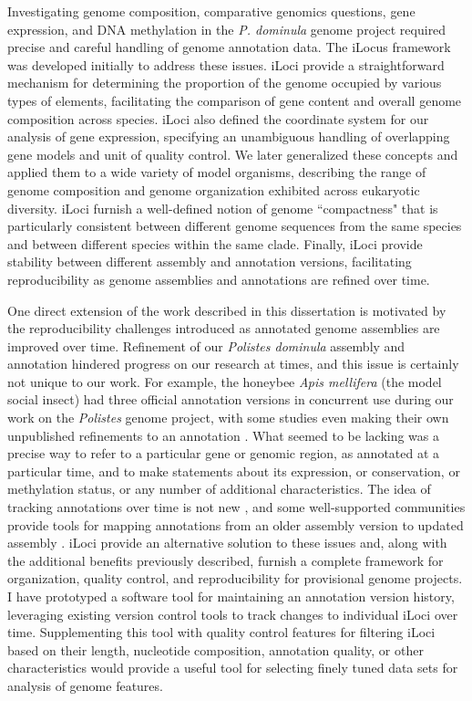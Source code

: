 Investigating genome composition, comparative genomics questions, gene expression, and DNA methylation in the \textit{P. dominula} genome project required precise and careful handling of genome annotation data.
The iLocus framework was developed initially to address these issues.
iLoci provide a straightforward mechanism for determining the proportion of the genome occupied by various types of elements, facilitating the comparison of gene content and overall genome composition across species.
iLoci also defined the coordinate system for our analysis of gene expression, specifying an unambiguous handling of overlapping gene models and unit of quality control.
We later generalized these concepts and applied them to a wide variety of model organisms, describing the range of genome composition and genome organization exhibited across eukaryotic diversity.
iLoci furnish a well-defined notion of genome ``compactness" that is particularly consistent between different genome sequences from the same species and between different species within the same clade.
Finally, iLoci provide stability between different assembly and annotation versions, facilitating reproducibility as genome assemblies and annotations are refined over time.

One direct extension of the work described in this dissertation is motivated by the reproducibility challenges introduced as annotated genome assemblies are improved over time.
Refinement of our \textit{Polistes dominula} assembly and annotation hindered progress on our research at times, and this issue is certainly not unique to our work.
For example, the honeybee \textit{Apis mellifera} (the model social insect) had three official annotation versions in concurrent use during our work on the \textit{Polistes} genome project, with some studies even making their own unpublished refinements to an annotation \cite{Dnmt3KD,TrueSight}.
What seemed to be lacking was a precise way to refer to a particular gene or genomic region, as annotated at a particular time, and to make statements about its expression, or conservation, or methylation status, or any number of additional characteristics.
The idea of tracking annotations over time is not new \cite{Eilbeck}, and some well-supported communities provide tools for mapping annotations from an older assembly version to updated assembly \cite{liftOver,PAGIT}.
iLoci provide an alternative solution to these issues and, along with the additional benefits previously described, furnish a complete framework for organization, quality control, and reproducibility for provisional genome projects.
I have prototyped a software tool for maintaining an annotation version history, leveraging existing version control tools to track changes to individual iLoci over time.
Supplementing this tool with quality control features for filtering iLoci based on their length, nucleotide composition, annotation quality, or other characteristics would provide a useful tool for selecting finely tuned data sets for analysis of genome features.
